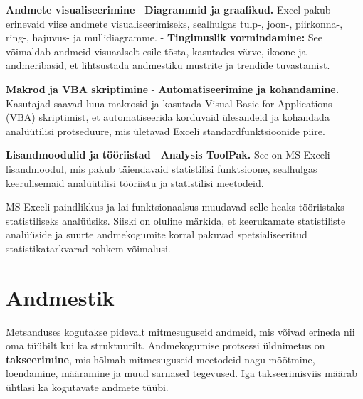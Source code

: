 \documentclass[
]{book}
\begin{document}
\textbf{Andmete visualiseerimine}
- \textbf{Diagrammid ja graafikud.} Excel pakub erinevaid viise andmete visualiseerimiseks, sealhulgas tulp-, joon-, piirkonna-, ring-, hajuvus- ja mullidiagramme.
- \textbf{Tingimuslik vormindamine:} See võimaldab andmeid visuaalselt esile tõsta, kasutades värve, ikoone ja andmeribasid, et lihtsustada andmestiku mustrite ja trendide tuvastamist.

\textbf{Makrod ja VBA skriptimine}
- \textbf{Automatiseerimine ja kohandamine.} Kasutajad saavad luua makrosid ja kasutada Visual Basic for Applications (VBA) skriptimist, et automatiseerida korduvaid ülesandeid ja kohandada analüütilisi protseduure, mis ületavad Exceli standardfunktsioonide piire.

\textbf{Lisandmoodulid ja tööriistad}
- \textbf{Analysis ToolPak.} See on MS Exceli lisandmoodul, mis pakub täiendavaid statistilisi funktsioone, sealhulgas keerulisemaid analüütilisi tööriistu ja statistilisi meetodeid.

MS Exceli paindlikkus ja lai funktsionaalsus muudavad selle heaks tööriistaks statistiliseks analüüsiks. Siiski on oluline märkida, et keerukamate statistiliste analüüside ja suurte andmekogumite korral pakuvad spetsialiseeritud statistikatarkvarad rohkem võimalusi.

\chapter{Andmestik}\label{andmestik}

Metsanduses kogutakse pidevalt mitmesuguseid andmeid, mis võivad erineda nii oma tüübilt kui ka struktuurilt. Andmekogumise protsessi üldnimetus on \textbf{takseerimine}, mis hõlmab mitmesuguseid meetodeid nagu mõõtmine, loendamine, määramine ja muud sarnased tegevused. Iga takseerimisviis määrab ühtlasi ka kogutavate andmete tüübi.
\end{document}

